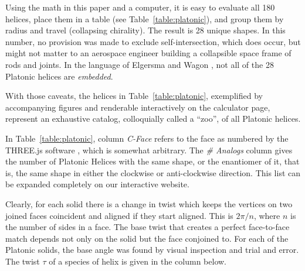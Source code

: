 \documentclass[mathematics,article,submit,pdftex,moreauthors]{Definitions/mdpi}
\begin{document}
Using the math in this paper and a computer, it is easy to evaluate all 180 helices,
place them in a table (see Table~\ref{table:platonic}), and group them
by radius and travel (collapsing chirality).
The result is 28 unique shapes. In this number, no provision was made to exclude
self-intersection,
which does occur, but might not matter to
an aerospace engineer building a collapsible space frame of rods and joints.
In the language of Elgersma and Wagon \cite{elgersma2016quadrahelix,elgersma2017asymptotically}, not
all of the 28 Platonic helices are {\em embedded}.

With those caveats, the helices in Table~\ref{table:platonic}, exemplified by
accompanying figures and renderable
interactively on the calculator page, represent an exhaustive catalog,
colloquially called a ``zoo'', of all Platonic helices.

In Table~\ref{table:platonic}, column {\em C-Face} refers to the
face as numbered by the THREE.js software \cite{dirksen2013learning},
which is somewhat arbitrary. The {\em \# Analogs}
column gives the number of Platonic Helices with the same shape, or the enantiomer of it,
that is, the same
shape in either the clockwise or anti-clockwise direction.
This list can be expanded completely on our interactive website.

Clearly, for each solid there is a change in twist which keeps the vertices on
two joined faces coincident and
aligned if they start aligned. This is $2\pi/n$,
where $n$ is the number of sides in a face. The base twist that creates
a perfect face-to-face match depends not only on the solid but the face conjoined to.
For each of the Platonic
solids, the base angle was found by visual inspection and trial and error.
The twist $\tau$ of a species
of helix is given in the column below.
\end{document}
